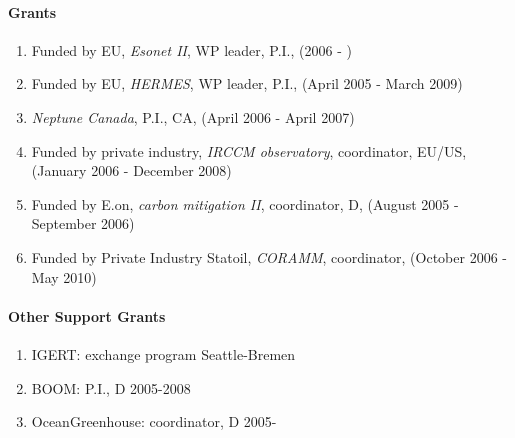 \paragraph{Grants}
\begin{enumerate}

\item
Funded by EU, \emph{Esonet II}, WP leader, P.I., (2006 - )

\item
Funded by EU, \emph{HERMES}, WP leader, P.I., (April 2005 -  March 2009)

\item
\emph{Neptune Canada},  P.I., CA, (April 2006 - April 2007)

\item
Funded by private industry, \emph{IRCCM observatory}, coordinator, EU/US, (January 2006 -
December 2008) 

\item
Funded by E.on, \emph{carbon mitigation II}, coordinator, D, (August 2005 - September
2006) 

\item
Funded by Private Industry Statoil, \emph{CORAMM}, coordinator, (October 2006 - May 2010) 
\end{enumerate}

\paragraph{Other Support Grants}
\begin{enumerate}
\item IGERT: exchange program Seattle-Bremen
\item BOOM: P.I., D 2005-2008
 \item OceanGreenhouse: coordinator,
D 2005-
\end{enumerate}


\nocite{Thomsen1} \nocite{Thomsen2} \nocite{Thomsen3}
\nocite{Thomsen4} \nocite{Thomsen5}
